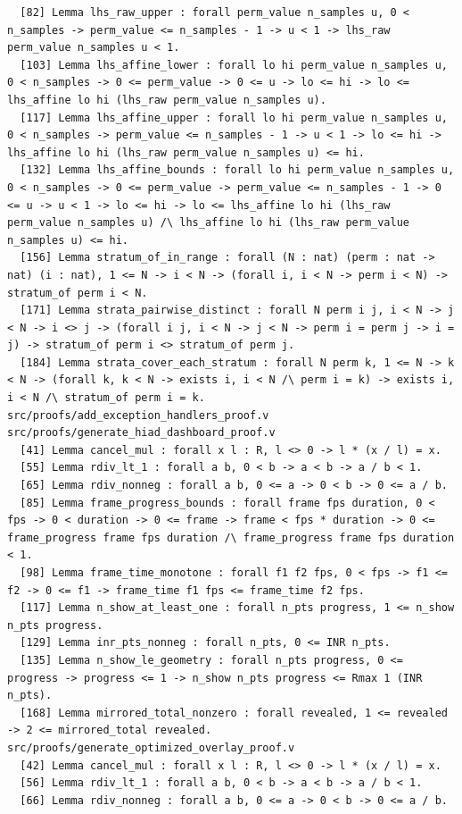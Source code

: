 \documentclass[11pt]{article}
\theoremstyle{definition}
\begin{document}
\begin{verbatim}
  [82] Lemma lhs_raw_upper : forall perm_value n_samples u, 0 < n_samples -> perm_value <= n_samples - 1 -> u < 1 -> lhs_raw perm_value n_samples u < 1.
  [103] Lemma lhs_affine_lower : forall lo hi perm_value n_samples u, 0 < n_samples -> 0 <= perm_value -> 0 <= u -> lo <= hi -> lo <= lhs_affine lo hi (lhs_raw perm_value n_samples u).
  [117] Lemma lhs_affine_upper : forall lo hi perm_value n_samples u, 0 < n_samples -> perm_value <= n_samples - 1 -> u < 1 -> lo <= hi -> lhs_affine lo hi (lhs_raw perm_value n_samples u) <= hi.
  [132] Lemma lhs_affine_bounds : forall lo hi perm_value n_samples u, 0 < n_samples -> 0 <= perm_value -> perm_value <= n_samples - 1 -> 0 <= u -> u < 1 -> lo <= hi -> lo <= lhs_affine lo hi (lhs_raw perm_value n_samples u) /\ lhs_affine lo hi (lhs_raw perm_value n_samples u) <= hi.
  [156] Lemma stratum_of_in_range : forall (N : nat) (perm : nat -> nat) (i : nat), 1 <= N -> i < N -> (forall i, i < N -> perm i < N) -> stratum_of perm i < N.
  [171] Lemma strata_pairwise_distinct : forall N perm i j, i < N -> j < N -> i <> j -> (forall i j, i < N -> j < N -> perm i = perm j -> i = j) -> stratum_of perm i <> stratum_of perm j.
  [184] Lemma strata_cover_each_stratum : forall N perm k, 1 <= N -> k < N -> (forall k, k < N -> exists i, i < N /\ perm i = k) -> exists i, i < N /\ stratum_of perm i = k.
src/proofs/add_exception_handlers_proof.v
src/proofs/generate_hiad_dashboard_proof.v
  [41] Lemma cancel_mul : forall x l : R, l <> 0 -> l * (x / l) = x.
  [55] Lemma rdiv_lt_1 : forall a b, 0 < b -> a < b -> a / b < 1.
  [65] Lemma rdiv_nonneg : forall a b, 0 <= a -> 0 < b -> 0 <= a / b.
  [85] Lemma frame_progress_bounds : forall frame fps duration, 0 < fps -> 0 < duration -> 0 <= frame -> frame < fps * duration -> 0 <= frame_progress frame fps duration /\ frame_progress frame fps duration < 1.
  [98] Lemma frame_time_monotone : forall f1 f2 fps, 0 < fps -> f1 <= f2 -> 0 <= f1 -> frame_time f1 fps <= frame_time f2 fps.
  [117] Lemma n_show_at_least_one : forall n_pts progress, 1 <= n_show n_pts progress.
  [129] Lemma inr_pts_nonneg : forall n_pts, 0 <= INR n_pts.
  [135] Lemma n_show_le_geometry : forall n_pts progress, 0 <= progress -> progress <= 1 -> n_show n_pts progress <= Rmax 1 (INR n_pts).
  [168] Lemma mirrored_total_nonzero : forall revealed, 1 <= revealed -> 2 <= mirrored_total revealed.
src/proofs/generate_optimized_overlay_proof.v
  [42] Lemma cancel_mul : forall x l : R, l <> 0 -> l * (x / l) = x.
  [56] Lemma rdiv_lt_1 : forall a b, 0 < b -> a < b -> a / b < 1.
  [66] Lemma rdiv_nonneg : forall a b, 0 <= a -> 0 < b -> 0 <= a / b.

\end{verbatim}
\end{document}
